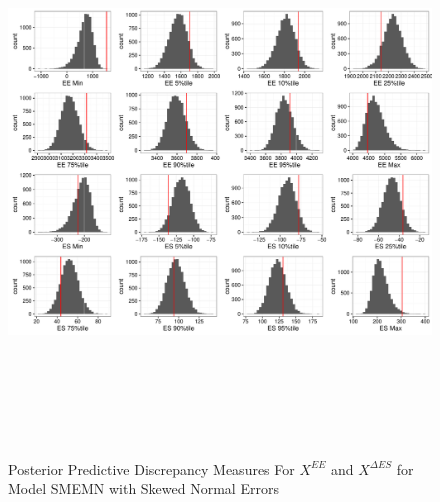 \documentclass[11pt]{article}\usepackage[]{graphicx}\usepackage[]{color}
\begin{document}
% 
% 
 \begin{figure}
  \centering
  \includegraphics[width=17cm,height=15cm]{manual_figure/wpxdiagbvn.pdf}
  \caption{Posterior Predictive Discrepancy Measures For $X^{EE}$ and $X^{\Delta ES}$ for Model SMEMN with Skewed Normal Errors}
  \label{wpxdiagSMEMN}
  \end{figure}
\end{document}
